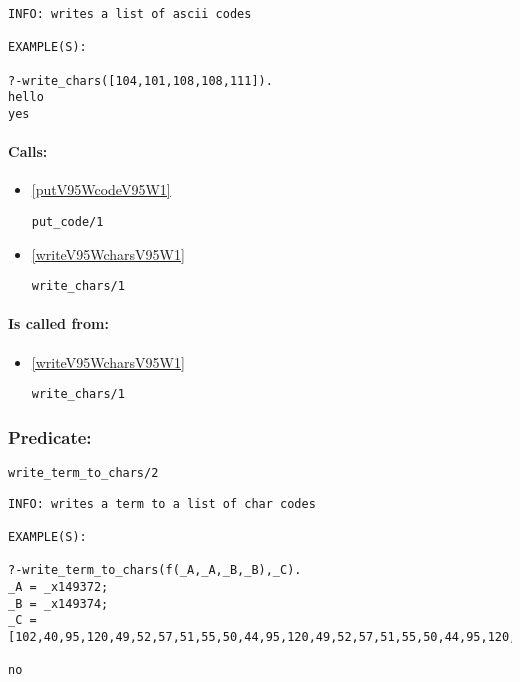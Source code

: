 {\small \begin{verbatim}
INFO: writes a list of ascii codes

EXAMPLE(S):

?-write_chars([104,101,108,108,111]).
hello
yes

\end{verbatim}}
\paragraph{Calls:} 
\begin{itemize}
\item \ref{putV95WcodeV95W1} 
\begin{verbatim}
put_code/1
\end{verbatim}

\item \ref{writeV95WcharsV95W1} 
\begin{verbatim}
write_chars/1
\end{verbatim}

\end{itemize}
\paragraph{Is called from:} 
\begin{itemize}
\item \ref{writeV95WcharsV95W1} 
\begin{verbatim}
write_chars/1
\end{verbatim}

\end{itemize}

\subsubsection{Predicate:} \label{writeV95WtermV95WtoV95WcharsV95W2}

\begin{verbatim}
write_term_to_chars/2
\end{verbatim}

{\small \begin{verbatim}
INFO: writes a term to a list of char codes

EXAMPLE(S):

?-write_term_to_chars(f(_A,_A,_B,_B),_C).
_A = _x149372;
_B = _x149374;
_C = [102,40,95,120,49,52,57,51,55,50,44,95,120,49,52,57,51,55,50,44,95,120,49,52,57,51,55,52,44,95,120,49,52,57,51,55,52,41];

no

\end{verbatim}}
